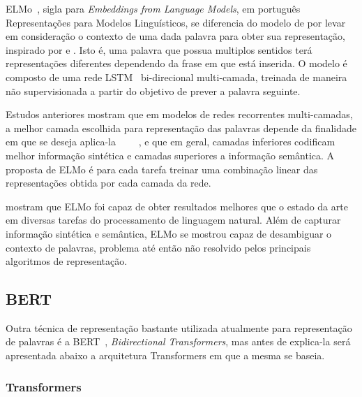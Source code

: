 ELMo~\cite{peters18}, sigla para \textit{Embeddings from Language Models}, em
português Representações para Modelos Linguísticos, se diferencia do modelo de
\citet{cho14} por levar em consideração o contexto de uma dada palavra para
obter sua representação, inspirado por \citet{peters17} e \citet{mccann17}.
Isto é, uma palavra que possua multiplos sentidos terá representações diferentes
dependendo da frase em que está inserida.
O modelo é composto de uma rede LSTM~\cite{hochreiter97} bi-direcional
multi-camada, treinada de maneira não supervisionada a partir do objetivo de
prever a palavra seguinte.

Estudos anteriores mostram que em modelos de redes recorrentes multi-camadas,
a melhor camada escolhida para representação das palavras depende da finalidade
em que se deseja aplica-la
~\cite{hashimoto16}~\cite{sogaard16}~\cite{belinkov17}~\cite{melamud16}, e que
em geral, camadas inferiores codificam melhor informação sintética e camadas
superiores a informação semântica.
A proposta de ELMo é para cada tarefa treinar uma combinação linear das
representações obtida por cada camada da rede.


\citet{peters18} mostram que ELMo foi capaz de obter resultados melhores que o
estado da arte em diversas tarefas do processamento de linguagem natural.
Além de capturar informação sintética e semântica, ELMo se mostrou capaz de
desambiguar o contexto de palavras, problema até então não resolvido pelos
principais algoritmos de representação.

\subsection{BERT}

Outra técnica de representação bastante utilizada atualmente para representação
de palavras é a BERT~\cite{devlin18}, \textit{Bidirectional Transformers}, mas
antes de explica-la será apresentada abaixo a arquitetura Transformers em que a
mesma se baseia.

\subsubsection{Transformers}

